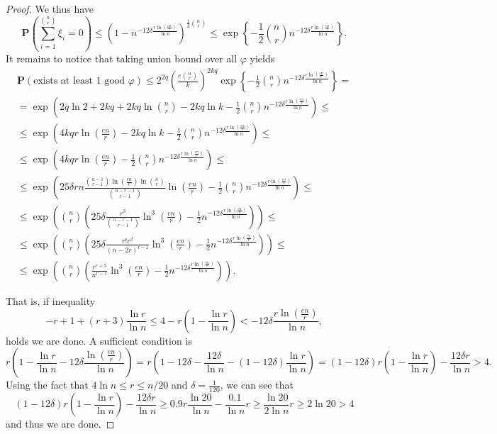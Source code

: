 \documentclass[10pt,a4paper]{article}
\theoremstyle{remark}
\theoremstyle{definition}
\newcommand{\mP}{\mathbf{P}}
\newcommand{\skob}[1]{\left(#1\right)}
\begin{document}
\begin{proof}
    	We thus have
	$$
         		\mP\skob{\sum_{i = 1}^{\binom{n}{r}}\xi_i = 0} \leq \skob{1 - n^{-12\delta\frac{ r\ln\skob{\frac{en}{r}}}{\ln n}}}^{\frac{1}{2}\binom{n}{r}} \leq \exp\left\{-\frac{1}{2}\binom{n}{r}n^{-12\delta\frac{r\ln\skob{\frac{en}{r}}}{\ln n}}\right\}.
	$$
	It remains to notice that taking union bound over all $\varphi$ yields 
	\begin{multline*}
		\mP(\text{exists at least } 1 \text{ good } \varphi) \leq 2^{2q}\skob{\frac{e\binom{n}{r}}{k}}^{2kq}\exp\left\{-\frac{1}{2}\binom{n}{r}n^{-12\delta\frac{r\ln\skob{\frac{en}{r}}}{\ln n}}\right\} = \\ 
		= \exp\skob{2q\ln 2 + 2kq + 2kq\ln\binom{n}{r} - 2kq\ln k - \frac12\binom{n}{r}n^{-12\delta\frac{r\ln\skob{\frac{en}{r}}}{\ln n}}} \leq \\
		\leq \exp\skob{4kqr\ln\skob{\frac{en}{r}} - 2kq\ln k - \frac12\binom{n}{r}n^{-12\delta\frac{r\ln\skob{\frac{en}{r}}}{\ln n}}} \leq \\ 
		\leq \exp\skob{4kqr\ln\skob{\frac{en}{r}} - \frac12\binom{n}{r}n^{-12\delta\frac{r\ln\skob{\frac{en}{r}}}{\ln n}}} \leq \\
		\leq  \exp\skob{25\delta rn\frac{\binom{n-1}{r-1}\ln\skob{\frac{en}{r}}\ln \binom{n}{r}}{\binom{n-r-1}{r-1}}\ln\skob{\frac{en}{r}} - \frac12\binom{n}{r}n^{-12\delta\frac{r\ln\skob{\frac{en}{r}}}{\ln n}}} \leq \\
		\leq  \exp\skob{\binom{n}{r}\skob{25\delta \frac{r^3}{\binom{n-r-1}{r-1}}\ln^3\skob{\frac{en}{r}} - \frac12n^{-12\delta\frac{r\ln\skob{\frac{en}{r}}}{\ln n}}}} \leq \\
		\leq  \exp\skob{\binom{n}{r}\skob{25\delta \frac{r!r^2}{(n-2r)^{r-1}}\ln^3\skob{\frac{en}{r}} - \frac12n^{-12\delta\frac{r\ln\skob{\frac{en}{r}}}{\ln n}}}} \leq \\ 
		\leq  \exp\skob{\binom{n}{r}\skob{\frac{r^{r+3}}{n^{r-1}}\ln^3\skob{\frac{en}{r}} - \frac12n^{-12\delta\frac{r\ln\skob{\frac{en}{r}}}{\ln n}}}}.
    \end{multline*}
   
	That is, if inequality 
	$$
		-r+1+(r+3)\frac{\ln r}{\ln n} \leq 4 - r\skob{1-\frac{\ln r}{\ln n}} < -12\delta\frac{r\ln\skob{\frac{en}{r}}}{\ln n},
	$$
	holds we are done. A sufficient condition is
	$$
		r\skob{1-\frac{\ln r}{\ln n}-12\delta\frac{\ln\skob{\frac{en}{r}}}{\ln n}} = r\skob{1-12\delta-\frac{12\delta}{\ln n} - (1-12\delta)\frac{\ln r}{\ln n}} = (1-12\delta)r\skob{1 - \frac{\ln r}{\ln n}} - \frac{12\delta r}{\ln n} > 4.
	$$
	Using the fact that $4\ln n \leq r \leq n/20$ and $\delta = \frac{1}{120}$, we can see that
	$$
 		 (1-12\delta)r\skob{1 - \frac{\ln r}{\ln n}} - \frac{12\delta r}{\ln n} \geq 0.9r\frac{\ln 20}{\ln n} - \frac{0.1}{\ln n}r \geq \frac{\ln 20}{2\ln n}r \geq 2\ln 20 > 4
	$$ 
	and thus we are done.
\end{proof}
\end{document}

